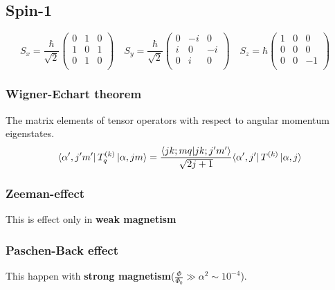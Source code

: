 \subsection{Spin-1}
\begin{equation}
    S_x=\frac{\hbar}{\sqrt{2}}
    \begin{pmatrix}
	0   & 1	& 0 \\
	1   & 0	& 1 \\
	0   & 1	& 0 \\
    \end{pmatrix}\quad
    S_y=\frac{\hbar}{\sqrt{2}}
    \begin{pmatrix}
	0   & -i    & 0 \\
	i   & 0	& -i \\
	0   & i	& 0 \\
    \end{pmatrix}\quad
    S_z=\hbar
    \begin{pmatrix}
	1   & 0	& 0 \\
	0   & 0	& 0 \\
	0   & 0	& -1 \\
    \end{pmatrix}\quad
\end{equation}

\subsubsection{Wigner-Echart theorem}
The matrix elements of tensor operators with respect to angular momentum
eigenstates.
\begin{equation}
    \bra{\alpha^\prime,j^{\prime}m^\prime}T^{(k)}_{q}\ket{\alpha,jm}
    =\frac{\bra{jk;mq}\ket{jk;j^{\prime}m^\prime}}{\sqrt{2j+1}}{\bra{\alpha^\prime,j^\prime}T^{(k)}\ket{\alpha,j}}
\end{equation}

\subsubsection{Zeeman-effect}
This is effect only in \textbf{weak magnetism}

\subsubsection{Paschen-Back effect}
This happen with \textbf{strong magnetism}($\frac{\Phi}{\Phi_0}\gg\alpha^2\sim10^{-4}$).



